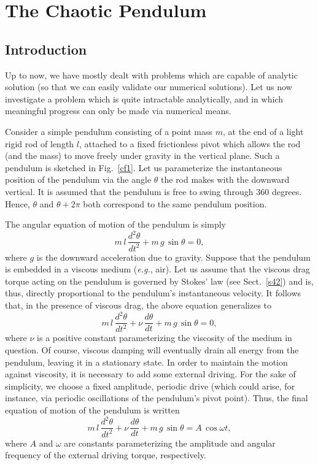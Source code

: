 \chapter{The Chaotic Pendulum}\label{schaos}
\section{Introduction}
Up to now, we have mostly dealt with problems which are capable of analytic solution (so that we can
easily validate our numerical solutions). Let us now investigate a problem
which is quite intractable analytically, and  in which meaningful progress can only be
made via numerical means.

Consider a simple pendulum consisting of a point mass $m$, at the end of a light
rigid rod of length $l$, attached to a fixed frictionless pivot
which allows the rod (and the mass) to move freely under gravity in the vertical plane. Such a
pendulum is sketched in Fig.~\ref{cf1}. Let us parameterize the instantaneous position
of the pendulum via the angle $\theta$ the rod makes with the downward vertical. It is
assumed that the pendulum is free to swing through 360 degrees. Hence, $\theta$ and $\theta +2\pi$
both correspond to the same pendulum position.


The angular equation of motion of the pendulum is simply
\begin{equation}
m\,l\,\frac{d^2\theta}{dt^2} + m\,g\,\sin\theta = 0,
\end{equation}
where $g$ is the downward acceleration due to gravity. 
Suppose that the pendulum is embedded in  a viscous medium ({\em e.g.}, air). 
Let us assume that the viscous drag torque acting on the pendulum is
governed by Stokes' law (see Sect.~\ref{s42}) and is, thus,
directly proportional to the pendulum's instantaneous velocity.
 It follows that, in the presence of viscous drag, the above
equation generalizes to
\begin{equation}
m\,l\,\frac{d^2\theta}{dt^2}+ \nu\,\frac{d\theta}{dt} + m\,g\,\sin\theta = 0,
\end{equation}
where $\nu$ is a positive constant parameterizing the viscosity of the medium
in question. Of course, viscous
damping will eventually drain all energy from the pendulum, leaving it in a stationary state. 
In order to maintain the motion against viscosity, it is necessary to add some external driving.
For the sake of simplicity, we choose a fixed amplitude, periodic drive (which could arise, for
instance, via periodic oscillations of the pendulum's pivot point). Thus, the final equation
of motion of the pendulum is written
\begin{equation}\label{e5.3}
m\,l\,\frac{d^2\theta}{dt^2}+ \nu\,\frac{d\theta}{dt} + m\,g\,\sin\theta =  A\,\cos\omega t,
\end{equation}
where $A$ and $\omega$ are  constants parameterizing the amplitude
and angular frequency  of the external driving torque, respectively.

